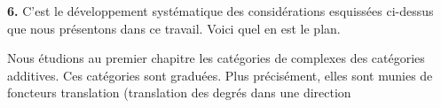 \noindent\textbf{6.}\quad
C'est le développement systématique des considérations esquissées ci-dessus
que nous présentons dans ce travail. Voici quel en est le plan.

Nous étudions au premier chapitre les catégories de complexes des catégories
additives. Ces catégories sont graduées. Plus précisément, elles sont munies
de foncteurs translation (translation des degrés dans une direction

